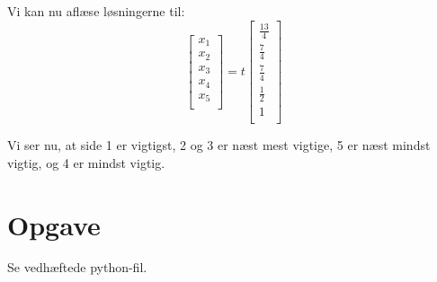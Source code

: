 \documentclass[a4paper,12pt]{article}
\begin{document}
Vi kan nu aflæse løsningerne til:
\[
\left[\begin{array}{c}
    x_1\\
    x_2\\
    x_3\\
    x_4\\
    x_5\\
\end{array}\right]
=
t
\left[\begin{array}{c}
    \frac{13}{4}\\
    \frac{7}{4}\\
    \frac{7}{4}\\
    \frac{1}{2}\\
    1\\
\end{array}\right]
\]

Vi ser nu, at side 1 er vigtigst, 2 og 3 er næst mest vigtige, 5 er næst mindst vigtig, og 4 er mindst vigtig.

\section[Opgave]{Opgave}
Se vedhæftede python-fil.
\end{document}
